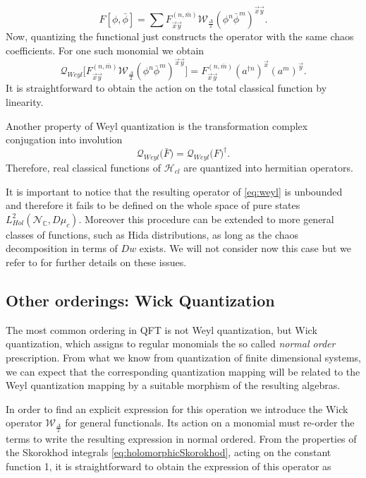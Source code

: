 \documentclass[12pt]{article}%
\begin{document}
\begin{equation}
\label{eq:f_chaos}
F[\phi, \bar \phi] =\sum F^{(n,\bar{m})}_{\vec{x}\vec{y}}\mathcal{W}_{\frac{\Delta}{2}}(\phi^n\bar\phi^m)^{\vec{x}\vec{y}}.   
\end{equation}
Now, quantizing the functional just constructs the operator with the same chaos coefficients. For one such monomial we obtain
\begin{equation}
\label{eq:weyl}
\mathcal{Q}_{Weyl}\big[F^{(n,\bar{m})}_{\vec{x}\vec{y}}\mathcal{W}_{\frac{\Delta}{2}}(\phi^n\bar\phi^m)^{\vec{x}\vec{y}}\big]= F^{(n,\bar m)}_{\vec{x}\vec{y}}(a^{\dagger n})^{\vec{x}}(a^m)^{\vec{y}}.
 \end{equation}
It is straightforward to obtain the action on the total classical function by linearity.

Another property of Weyl quantization is the transformation complex conjugation into involution 
\begin{equation}
\label{eq:involution}
\mathcal{Q}_{Weyl}\big(\bar F\big)= \mathcal{Q}_{Weyl}\big(F\big)^{\dagger}.
\end{equation}
 Therefore, real classical functions  of $\mathcal{H}_{cl}$ are quantized into hermitian operators.

It  is important to notice that the resulting operator of \eqref{eq:weyl} is unbounded and therefore it fails  to be defined on the whole space of pure states $L^2_{Hol}(\mathcal{N}_{\mathbb{C}},D\mu_c)$. Moreover this procedure can be extended to more general classes of functions, such as Hida distributions, as long as the chaos decomposition in terms of $Dw$ exists. We will not consider now this case but we refer to  \cite{alonso2023a} for further details on these issues.

\subsection{Other orderings: Wick Quantization} 
The most common ordering in QFT is not Weyl quantization, but Wick quantization, which  assigns to regular monomials the so called \textit{normal order} prescription. From what we know from quantization of finite dimensional systems, we can expect that the corresponding quantization mapping will be related to the Weyl quantization  mapping by a suitable morphism of the resulting algebras. 

In order to find an explicit expression for this operation  we introduce  the Wick operator $\mathcal{W}_{\frac{\Delta}{2}}$ for general functionals. Its action on a monomial must re-order the terms to write the resulting expression in normal ordered. From the properties of the Skorokhod integrals \eqref{eq:holomorphicSkorokhod}, acting on the constant function 1, it is straightforward to obtain  the expression of this operator as 
\end{document}
